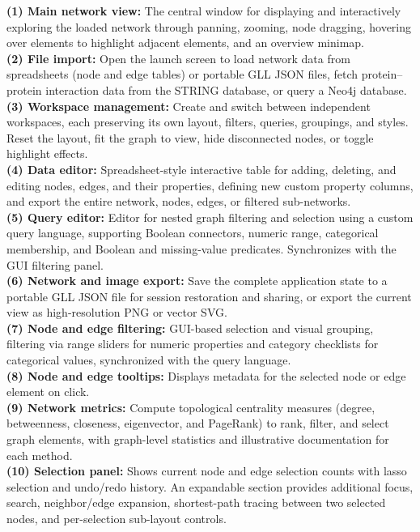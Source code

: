 \noindent
\textbf{(1) Main network view:} The central window for displaying and interactively exploring the loaded network through panning, zooming, node dragging, hovering over elements to highlight adjacent elements, and an overview minimap. \\
\textbf{(2) File import:} Open the launch screen to load network data from spreadsheets (node and edge tables) or portable GLL JSON files, fetch protein--protein interaction data from the STRING database, or query a Neo4j database. \\
\textbf{(3) Workspace management:} Create and switch between independent workspaces, each preserving its own layout, filters, queries, groupings, and styles. Reset the layout, fit the graph to view, hide disconnected nodes, or toggle highlight effects. \\
\textbf{(4) Data editor:} Spreadsheet-style interactive table for adding, deleting, and editing nodes, edges, and their properties, defining new custom property columns, and export the entire network, nodes, edges, or filtered sub-networks. \\
\textbf{(5) Query editor:} Editor for nested graph filtering and selection using a custom query language, supporting Boolean connectors, numeric range, categorical membership, and Boolean and missing-value predicates. Synchronizes with the GUI filtering panel. \\
\textbf{(6) Network and image export:} Save the complete application state to a portable GLL JSON file for session restoration and sharing, or export the current view as high-resolution PNG or vector SVG. \\
\textbf{(7) Node and edge filtering:} GUI-based selection and visual grouping, filtering via range sliders for numeric properties and category checklists for categorical values, synchronized with the query language. \\
\textbf{(8) Node and edge tooltips:} Displays metadata for the selected node or edge element on click. \\
\textbf{(9) Network metrics:} Compute topological centrality measures (degree, betweenness, closeness, eigenvector, and PageRank) to rank, filter, and select graph elements, with graph-level statistics and illustrative documentation for each method. \\
\textbf{(10) Selection panel:} Shows current node and edge selection counts with lasso selection and undo/redo history. An expandable section provides additional focus, search, neighbor/edge expansion, shortest-path tracing between two selected nodes, and per-selection sub-layout controls. \\
